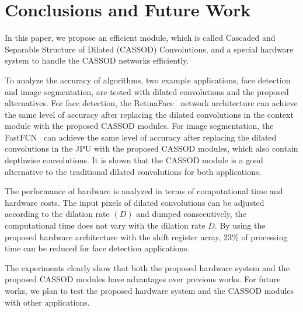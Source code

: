 \documentclass[10pt,twocolumn,letterpaper]{article}
\begin{document}
\section{Conclusions and Future Work}
\label{sec:conclusion}

In this paper, we propose an efficient module, which is called Cascaded and Separable Structure of Dilated (CASSOD) Convolutions, and a special hardware system to handle the CASSOD networks efficiently. 

To analyze the accuracy of algorithms, two example applications, face detection and image segmentation, are tested with dilated convolutions and the proposed alternatives. For face detection, the RetinaFace~\cite{Deng19} network architecture can achieve the same level of accuracy after replacing the dilated convolutions in the context module with the proposed CASSOD modules. For image segmentation, the FastFCN~\cite{Wu19} can achieve the same level of accuracy after replacing the dilated convolutions in the JPU with the proposed CASSOD modules, which also contain depthwise convolutions. It is shown that the CASSOD module is a good alternative to the traditional dilated convolutions for both applications.

The performance of hardware is analyzed in terms of computational time and hardware costs. The input pixels of dilated convolutions can be adjusted according to the dilation rate $(D)$  and dumped consecutively, the computational time does not vary with the dilation rate $D$. By using the proposed hardware architecture with the shift register array, 23\% of processing time can be reduced for face detection applications.

The experiments clearly show that both the proposed hardware system and the proposed CASSOD modules have advantages over previous works. For future works, we plan to test the proposed hardware system and the CASSOD modules with other applications.

{\small


}
\end{document}
